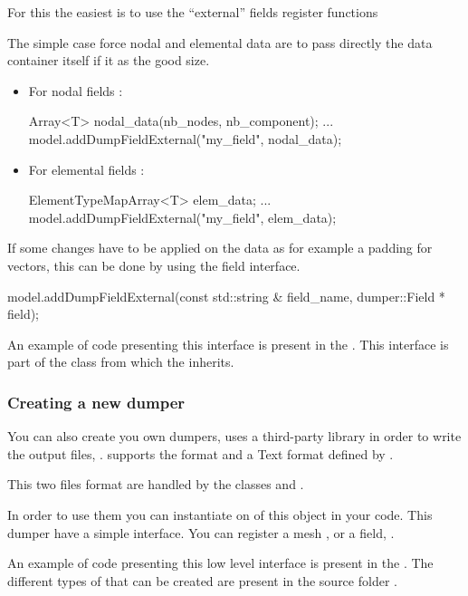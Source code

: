 For this the easiest is to use the ``external'' fields register functions

The simple case force nodal and elemental data are to pass directly the data
container itself if it as the good size.
\begin{itemize}
\item For nodal fields :
\begin{cpp}
  Array<T> nodal_data(nb_nodes, nb_component);
  ...
  model.addDumpFieldExternal("my_field", nodal_data);
\end{cpp}

\item For elemental fields :
\begin{cpp}
  ElementTypeMapArray<T> elem_data;
  ...
  model.addDumpFieldExternal("my_field", elem_data);
\end{cpp}
\end{itemize}

If some changes have to be applied on the data as for example a padding for
 vectors, this can be done by using the
field interface.

\begin{cpp}
  model.addDumpFieldExternal(const std::string & field_name,
                             dumper::Field * field);
\end{cpp}

An example of code presenting this interface is present in the
. This interface is part of the
 class from which the  inherits.

\subsubsection{Creating a new dumper}

You can also create you own dumpers, \akantu uses a third-party library in order
to write the output files, . \akantu supports the 
format and a Text format defined by .

This two files format are handled by the classes
 and
.

In order to use them you can instantiate on of this object in your code. This
dumper have a simple interface. You can register a mesh
,
 or a field,
.

An example of code presenting this low level interface is present in the
. The different types of  that can
be created are present in the source folder .

